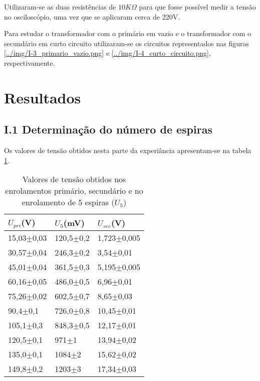 \documentclass[%
  reprint,
  nofootinbib,
  amsmath,amssymb,
  aps,
  10pt,
]{revtex4-1}
\begin{document}
Utilizaram-se as duas resistências de $10K\Omega$ para que fosse possível medir a tensão no osciloscópio, uma vez que se aplicaram cerca de 220V.

Para estudar o transformador com o primário em vazio e o transformador com o secundário em curto circuito utilizaram-se os circuitos representados nas figuras \ref{../img/I-3_primario_vazio.png} e \ref{../img/I-4_curto_circuito.png}, respectivamente. 



\section{Resultados}
\label{s:resul}

\subsection*{I.1 Determinação do número de espiras}
Os valores de tensão obtidos nesta parte da experiância apresentam-se na tabela \ref{tab:mmo_fixe}.
\begin{table}[h]
\begin{tabular}{l|l|l}
$U_{pri}$(V)   & $U_5$(mV)     & $U_{sec}$(V)    \\ \hline
15,03$\pm$0,03 & 120,5$\pm$0,2 & 1,723$\pm$0,005 \\ \hline
30,57$\pm$0,04 & 246,3$\pm$0,2 & 3,54$\pm$0,01   \\ \hline
45,01$\pm$0,04 & 361,5$\pm$0,3 & 5,195$\pm$0,005 \\ \hline
60,16$\pm$0,05 & 486,0$\pm$0,5 & 6,96$\pm$0,01   \\ \hline
75,26$\pm$0,02 & 602,5$\pm$0,7 & 8,65$\pm$0,03   \\ \hline
90,4$\pm$0,1   & 726,0$\pm$0,8 & 10,45$\pm$0,01  \\ \hline
105,1$\pm$0,3  & 848,3$\pm$0,5 & 12,17$\pm$0,01  \\ \hline
120,5$\pm$0,1  & 971$\pm$1     & 13,94$\pm$0,02  \\ \hline
135,0$\pm$0,1  & 1084$\pm$2    & 15,62$\pm$0,02  \\ \hline
149,8$\pm$0,2  & 1203$\pm$3    & 17,34$\pm$0,03 
\end{tabular}
\caption{Valores de tensão obtidos nos enrolamentos primário, secundário e no enrolamento de 5 espiras ($U_5$)}
\label{tab:mmo_fixe}
\end{table}
\end{document}
